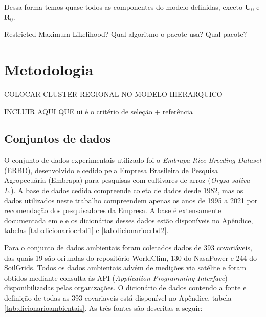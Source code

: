 \documentclass[12pt, a4paper, twoside]{report}
\numberwithin{equation}{subsection} %
\begin{document}
Dessa forma temos quase todos as componentes do modelo definidas, exceto $\mathbf{U}_0$ e $\mathbf{R}_0$.

Restricted Maximum Likelihood?
Qual algoritmo o pacote usa?
Qual pacote?


\chapter{Metodologia}


COLOCAR CLUSTER REGIONAL NO MODELO HIERARQUICO

INCLUIR AQUI QUE ui é o critério de seleção + referência




\section{Conjuntos de dados}


O conjunto de dados experimentais utilizado foi o \textit{Embrapa Rice Breeding Dataset} (ERBD), desenvolvido e cedido pela Empresa Brasileira de Pesquisa Agropecuária (Embrapa) para pesquisas com cultivares de arroz (\textit{Oryza sativa L.}). A base de dados cedida compreende coleta de dados desde 1982, mas os dados utilizados neste trabalho compreendem apenas os anos de 1995 a 2021 por recomendação dos pesquisadores da Empresa. A base é extensamente documentada em \cite{breseghello2011} e \cite{breseghello2021} e os dicionários desses dados estão disponíveis no Apêndice, tabelas \ref{tab:dicionarioerbd1} e \ref{tab:dicionarioerbd2}.

Para o conjunto de dados ambientais foram coletados dados de 393 covariáveis, das quais 19 são oriundas do repositório WorldClim, 130 do NasaPower e 244 do SoilGrids. Todos os dados ambientais advém de medições via satélite e foram obtidos mediante consulta às API (\textit{Application Programming Interface}) disponibilizadas pelas organizações. O dicionário de dados contendo a fonte e definição de todas as 393 covariaveis está disponível no Apêndice, tabela \ref{tab:dicionarioambientais}.  As três fontes são descritas a seguir:
\end{document}
